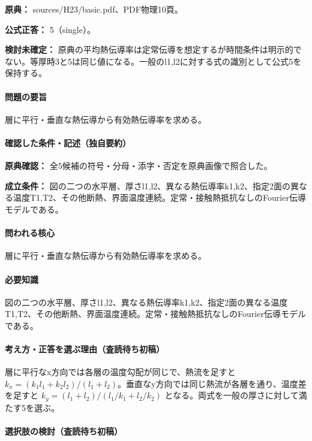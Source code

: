 \noindent\textbf{原典：} sources/H23/basic.pdf、PDF物理10頁。

\textbf{公式正答：} 5（single）。

\par\textbf{検討未確定：} 原典の平均熱伝導率は定常伝導を想定するが時間条件は明示的でない。等厚時3と5は同じ値になる。一般のl1,l2に対する式の識別として公式5を保持する。

\paragraph{問題の要旨} 層に平行・垂直な熱伝導から有効熱伝導率を求める。

\paragraph{確認した条件・記述（独自要約）}\mbox{}\par

\noindent\textbf{原典確認：} 全5候補の符号・分母・添字・否定を原典画像で照合した。\par

\noindent\textbf{成立条件：} 図の二つの水平層、厚さl1,l2、異なる熱伝導率k1,k2、指定2面の異なる温度T1,T2、その他断熱、界面温度連続。定常・接触熱抵抗なしのFourier伝導モデルである。\par

\paragraph{問われる核心} 層に平行・垂直な熱伝導から有効熱伝導率を求める。

\paragraph{必要知識} 図の二つの水平層、厚さl1,l2、異なる熱伝導率k1,k2、指定2面の異なる温度T1,T2、その他断熱、界面温度連続。定常・接触熱抵抗なしのFourier伝導モデルである。

\paragraph{考え方・正答を選ぶ理由（査読待ち初稿）} 層に平行なx方向では各層の温度勾配が同じで、熱流を足すと \(k_x=(k_1l_1+k_2l_2)/(l_1+l_2)\)。垂直なy方向では同じ熱流が各層を通り、温度差を足すと \(k_y=(l_1+l_2)/(l_1/k_1+l_2/k_2)\) となる。両式を一般の厚さに対して満たす5を選ぶ。

\paragraph{選択肢の検討（査読待ち初稿）}\mbox{}\par

